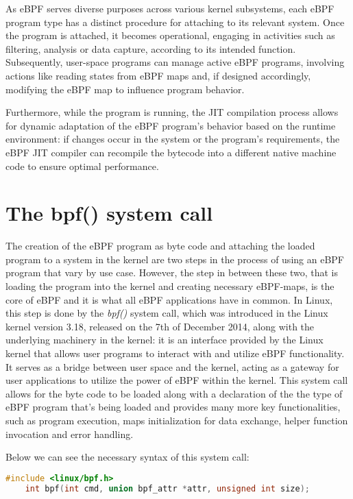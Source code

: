 As eBPF serves diverse purposes across various kernel subsystems, each eBPF program type has a distinct procedure for attaching to its relevant system. 
Once the program is attached, it becomes operational, engaging in activities such as filtering, analysis or data capture, according to its intended function. 
Subsequently, user-space programs can manage active eBPF programs, involving actions like reading states from eBPF maps and, if designed accordingly, modifying the eBPF map to influence program behavior.

Furthermore, while the program is running, the JIT compilation process allows for dynamic adaptation of the eBPF program's behavior based on the runtime environment: if changes occur in the system or the program's requirements, the eBPF JIT compiler can recompile the bytecode into a different native machine code to ensure optimal performance.

\section{The bpf() system call}

The creation of the eBPF program as byte code and attaching the loaded program to a system in the kernel are two steps in the process of using an eBPF program that vary by use case.
However, the step in between these two, that is loading the program into the kernel and creating necessary eBPF-maps, is the core of eBPF and it is what all eBPF applications have in common.
In Linux, this step is done by the \textit{bpf()} system call, which was introduced in the Linux kernel version 3.18, released on the 7th of December 2014, along with the underlying machinery in the kernel: it is an interface provided by the Linux kernel that allows user programs to interact with and utilize eBPF functionality. 
It serves as a bridge between user space and the kernel, acting as a gateway for user applications to utilize the power of eBPF within the kernel.
This system call allows for the byte code to be loaded along with a declaration of the the type of eBPF program that’s being loaded and provides many more key functionalities, such as program execution, maps initialization for data exchange, helper function invocation and error handling.

Below we can see the necessary syntax of this system call:

\begin{lstlisting}[language=C, caption={bpf() system call signature}]
	#include <linux/bpf.h>
	int bpf(int cmd, union bpf_attr *attr, unsigned int size);
\end{lstlisting}

